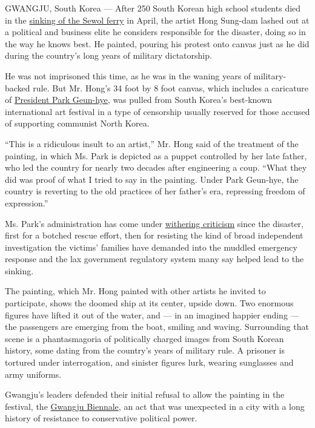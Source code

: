 GWANGJU, South Korea --- After 250 South Korean high school students
died in the
\href{http://www.nytimes3xbfgragh.onion/2014/04/17/world/asia/south-korean-ferry-accident.html}{sinking
of the Sewol ferry} in April, the artist Hong Sung-dam lashed out at a
political and business elite he considers responsible for the disaster,
doing so in the way he knows best. He painted, pouring his protest onto
canvas just as he did during the country's long years of military
dictatorship.

He was not imprisoned this time, as he was in the waning years of
military-backed rule. But Mr. Hong's 34 foot by 8 foot canvas, which
includes a caricature of
\href{http://topics.nytimes3xbfgragh.onion/top/reference/timestopics/people/p/park_geunhye/index.html}{President
Park Geun-hye}, was pulled from South Korea's best-known international
art festival in a type of censorship usually reserved for those accused
of supporting communist North Korea.

``This is a ridiculous insult to an artist,'' Mr. Hong said of the
treatment of the painting, in which Ms. Park is depicted as a puppet
controlled by her late father, who led the country for nearly two
decades after engineering a coup. ``What they did was proof of what I
tried to say in the painting. Under Park Geun-hye, the country is
reverting to the old practices of her father's era, repressing freedom
of expression.''

Ms. Park's administration has come under
\href{http://www.nytimes3xbfgragh.onion/2014/04/30/world/asia/south-korea-ferry-disaster.html}{withering
criticism} since the disaster, first for a botched rescue effort, then
for resisting the kind of broad independent investigation the victims'
families have demanded into the muddled emergency response and the lax
government regulatory system many say helped lead to the sinking.

The painting, which Mr. Hong painted with other artists he invited to
participate, shows the doomed ship at its center, upside down. Two
enormous figures have lifted it out of the water, and --- in an imagined
happier ending --- the passengers are emerging from the boat, smiling
and waving. Surrounding that scene is a phantasmagoria of politically
charged images from South Korean history, some dating from the country's
years of military rule. A prisoner is tortured under interrogation, and
sinister figures lurk, wearing sunglasses and army uniforms.

Gwangju's leaders defended their initial refusal to allow the painting
in the festival, the \href{http://www.gwangjubiennale.org/eng/}{Gwangju
Biennale}, an act that was unexpected in a city with a long history of
resistance to conservative political power.

